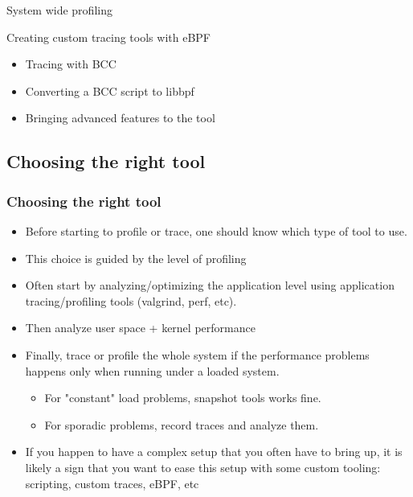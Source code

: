 \setuplabframe
{System wide profiling}
{
  Creating custom tracing tools with eBPF
  \begin{itemize}
    \item Tracing with BCC
    \item Converting a BCC script to libbpf
    \item Bringing advanced features to the tool
  \end{itemize}
}

\subsection{Choosing the right tool}

\begin{frame}[fragile]
  \frametitle{Choosing the right tool}
  \begin{itemize}
    \item Before starting to profile or trace, one should know which type of
          tool to use.
    \item This choice is guided by the level of profiling
    \item Often start by analyzing/optimizing the application level using
          application tracing/profiling tools (valgrind, perf, etc).
    \item Then analyze user space + kernel performance
    \item Finally, trace or profile the whole system if the performance problems
          happens only when running under a loaded system.
    \begin{itemize}
      \item For "constant" load problems, snapshot tools works fine.
      \item For sporadic problems, record traces and analyze them.
    \end{itemize}
  \item If you happen to have a complex setup that you often have to bring up,
  it is likely a sign that you want to ease this setup with some custom tooling:
  scripting, custom traces, eBPF, etc
  \end{itemize}
\end{frame}
